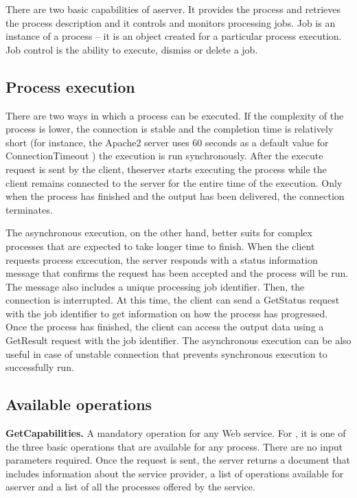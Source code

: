 There are two basic capabilities of aserver. It provides the
process and retrieves the process description and it controls and
monitors processing jobs. Job is an instance of a process – it is an
object created for a particular process execution. Job control is the
ability to execute, dismiss or delete a job.

\subsection{Process execution}


There are two ways in which a process can be executed. If the
complexity of the process is lower, the connection is stable and the
completion time is relatively short (for instance, the Apache2 server
uses 60 seconds as a default value for ConnectionTimeout \cite{apache})
the execution is run synchronously. After the execute request is sent
by the client, theserver starts executing the process while the
client remains connected to the server for the entire time of the
execution. Only when the process has finished and the output has been
delivered, the connection terminates.

The asynchronous execution, on the other hand, better suits for
complex processes that are expected to take longer time to
finish. When the client requests process excecution, the server
responds with a status information message that confirms the request
has been accepted and the process will be run. The message also
includes a unique processing job identifier. Then, the connection is
interrupted. At this time, the client can send a GetStatus request
with the job identifier to get information on how the process has
progressed. Once the process has finished, the client can access the
output data using a GetResult request with the job identifier. The
asynchronous execution can be also useful in case of unstable
connection that prevents synchronous execution to successfully run.

\subsection{Available operations}

\textbf{GetCapabilities.} A mandatory operation for any  Web
service. \cite{getcap} For , it is one of the three basic operations that are
available for any process. There are no input parameters required. Once
the request is sent, the server returns a document that includes
information about the service provider, a list of operations available
for aserver and a list of all the processes offered by the
service.

